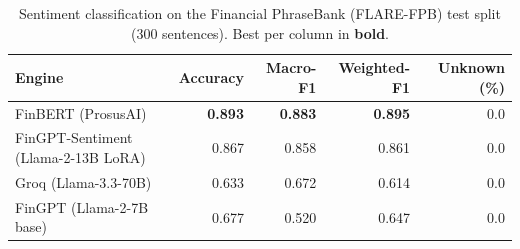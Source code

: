 \begin{table}[t]
  \centering
  \caption{Sentiment classification on the Financial PhraseBank (FLARE-FPB) test split (300 sentences). Best per column in \textbf{bold}.}
  \label{tab:sentiment-fpb}
  \begin{tabular}{lrrrr}
    \toprule
    Engine & Accuracy & Macro-F1 & Weighted-F1 & Unknown (\%) \\
    \midrule
    FinBERT (ProsusAI) & \textbf{0.893} & \textbf{0.883} & \textbf{0.895} & 0.0 \\
    FinGPT-Sentiment (Llama-2-13B LoRA) & 0.867 & 0.858 & 0.861 & 0.0 \\
    Groq (Llama-3.3-70B) & 0.633 & 0.672 & 0.614 & 0.0 \\
    FinGPT (Llama-2-7B base) & 0.677 & 0.520 & 0.647 & 0.0 \\
    \bottomrule
  \end{tabular}
\end{table}
